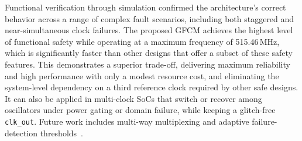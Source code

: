\documentclass[conference]{IEEEtran}
\begin{document}
Functional verification through simulation confirmed the architecture's correct behavior across a range of complex fault scenarios, including both staggered and near-simultaneous clock failures. The proposed GFCM achieves the highest level of functional safety while operating at a maximum frequency of 515.46\,MHz, which is significantly faster than other designs that offer a subset of these safety features. This demonstrates a superior trade-off, delivering maximum reliability and high performance with only a modest resource cost, and eliminating the system-level dependency on a third reference clock required by other safe designs. It can also be applied in multi-clock SoCs that switch or recover among oscillators under power gating or domain failure, while keeping a glitch-free \texttt{clk\_out}. Future work includes multi-way multiplexing and adaptive failure-detection thresholds~\cite{s20072103}.



\end{document}
